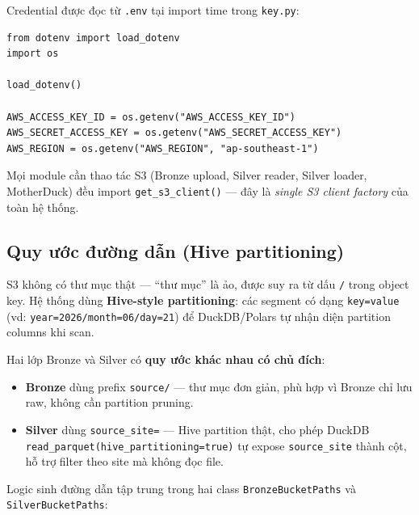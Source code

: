 Credential được đọc từ \texttt{.env} tại import time trong \texttt{key.py}:

\begin{lstlisting}[caption={\texttt{src/storage\_layer/MinIO\_S3/config/key.py}}, label={lst:key-py}]
from dotenv import load_dotenv
import os

load_dotenv()

AWS_ACCESS_KEY_ID = os.getenv("AWS_ACCESS_KEY_ID")
AWS_SECRET_ACCESS_KEY = os.getenv("AWS_SECRET_ACCESS_KEY")
AWS_REGION = os.getenv("AWS_REGION", "ap-southeast-1")
\end{lstlisting}

Mọi module cần thao tác S3 (Bronze upload, Silver reader, Silver loader,
MotherDuck) đều import \texttt{get\_s3\_client()} --- đây là \emph{single S3
client factory} của toàn hệ thống.


\subsection{Quy ước đường dẫn (Hive partitioning)}
\label{subsec:hive-partitioning}

S3 không có thư mục thật --- ``thư mục'' là ảo, được suy ra từ dấu \texttt{/}
trong object key. Hệ thống dùng \textbf{Hive-style partitioning}: các segment
có dạng \texttt{key=value} (vd: \texttt{year=2026/month=06/day=21}) để
DuckDB/Polars tự nhận diện partition columns khi scan.

Hai lớp Bronze và Silver có \textbf{quy ước khác nhau có chủ đích}:

\begin{itemize}
    \item \textbf{Bronze} dùng prefix \texttt{source/} --- thư mục đơn giản,
    phù hợp vì Bronze chỉ lưu raw, không cần partition pruning.
    \item \textbf{Silver} dùng \texttt{source\_site=} --- Hive partition thật,
    cho phép DuckDB \texttt{read\_parquet(hive\_partitioning=true)} tự expose
    \texttt{source\_site} thành cột, hỗ trợ filter theo site mà không đọc file.
\end{itemize}

Logic sinh đường dẫn tập trung trong hai class \texttt{BronzeBucketPaths} và
\texttt{SilverBucketPaths}:

